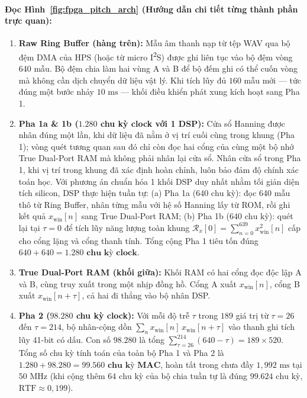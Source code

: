 \documentclass[11pt,a4paper]{article}
\begin{document}
\paragraph{Đọc Hình~\ref{fig:fpga_pitch_arch} (Hướng dẫn chi tiết từng thành phần trực quan):}
\begin{enumerate}
    \setlength{\itemsep}{1.5pt}
    \item \textbf{Raw Ring Buffer (hàng trên):} Mẫu âm thanh nạp từ tệp WAV qua bộ đệm DMA của HPS (hoặc từ micro I\textsuperscript{2}S) được ghi liên tục vào bộ đệm vòng 640 mẫu. Bộ đệm chia làm hai vùng A và B để bộ đếm ghi có thể cuốn vòng mà không cần dịch chuyển dữ liệu vật lý. Khi tích lũy đủ $160$ mẫu mới --- tức đúng một bước nhảy $10\text{ ms}$ --- khối điều khiển phát xung kích hoạt sang Pha 1.
    \item \textbf{Pha 1a \& 1b ($1.280$ chu kỳ clock với 1 DSP):} Cửa sổ Hanning được nhân đúng một lần, khi dữ liệu đã nằm ở vị trí cuối cùng trong khung (Pha 1); vòng quét tương quan sau đó chỉ còn đọc hai cổng của cùng một bộ nhớ True Dual-Port RAM mà không phải nhân lại cửa sổ. Nhân cửa sổ trong Pha 1, khi vị trí trong khung đã xác định hoàn chỉnh, luôn bảo đảm độ chính xác toán học. Với phương án chuẩn hóa 1 khối DSP duy nhất nhằm tối giản diện tích silicon, DSP thực hiện tuần tự: (a) Pha 1a ($640\text{ chu kỳ}$): đọc 640 mẫu thô từ Ring Buffer, nhân từng mẫu với hệ số Hanning lấy từ ROM, rồi ghi kết quả $x_{\text{win}}[n]$ sang True Dual-Port RAM; (b) Pha 1b ($640\text{ chu kỳ}$): quét lại tại $\tau = 0$ để tích lũy năng lượng toàn khung $\mathcal{R}_x[0] = \sum_{n=0}^{639} x_{\text{win}}^2[n]$ cấp cho cổng lặng và cổng thanh tính. Tổng cộng Pha 1 tiêu tốn đúng $640 + 640 = \mathbf{1.280\text{ chu kỳ clock}}$.
    \item \textbf{True Dual-Port RAM (khối giữa):} Khối RAM có hai cổng đọc độc lập A và B, cùng truy xuất trong một nhịp đồng hồ. Cổng A xuất $x_{\text{win}}[n]$, cổng B xuất $x_{\text{win}}[n+\tau]$, cả hai đi thẳng vào bộ nhân DSP.
    \item \textbf{Pha 2 ($98.280$ chu kỳ clock):} Với mỗi độ trễ $\tau$ trong $189$ giá trị từ $\tau=26$ đến $\tau=214$, bộ nhân-cộng dồn $\sum_n x_{\text{win}}[n]\,x_{\text{win}}[n+\tau]$ vào thanh ghi tích lũy 41-bit có dấu. Con số $98.280$ là tổng $\sum_{\tau=26}^{214}(640-\tau) = 189 \times 520$. Tổng số chu kỳ tính toán của toàn bộ Pha 1 và Pha 2 là $1.280 + 98.280 = \mathbf{99.560\text{ chu kỳ MAC}}$, hoàn tất trong chưa đầy $1{,}992\text{ ms}$ tại $50\text{ MHz}$ (khi cộng thêm $64\text{ chu kỳ}$ của bộ chia tuần tự là đúng $99.624\text{ chu kỳ}$, $\text{RTF} \approx 0{,}199$).

\end{enumerate}
\end{document}
